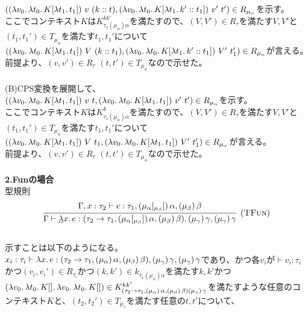 \documentclass[japanese,draft]{jssst_ppl} %
\begin{document}
$(\LamP{v_0}{\Lam{t_0}{K[\Lam{t_1}{t_1}]}}\ v\ \ConsP{k}{t}, \LamP{v_0}{\Lam{t_0}{K[\Lam{t_1}{\Cons{k'}{t_1}}]}}\ v'\ t')\in R_{\mu_{\alpha}}$を示す。\\
ここでコンテキスト$K$は$K^{kk'}_{\tau_1(\mu_{\alpha})\alpha}$を満たすので、$(V,V')\in R_{\tau}$を満たす$V,V'$と$(t_1, t_1')\in T_{\mu_{\alpha}}$を満たす$t_1, t_1'$について\\
$(\LamP{v_0}{\Lam{t_0}{K[\Lam{t_1}{t_1}]}}\ V\ \ConsP{k}{t_1}, \LamP{v_0}{\Lam{t_0}{K[\Lam{t_1}{\Cons{k'}{t_1}}]}}\ V'\ t_1')\in R_{\mu_{\alpha}}$が言える。\\
前提より、$(v,v')\in R_{\tau}$ $(t, t') \in T_{\mu_{\alpha}}$なので示せた。\\
\\
(B)CPS変換を展開して、\\
$(\LamP{v_0}{\Lam{t_0}{K[\Lam{t_1}{t_1}]}}\ v\ t, \LamP{v_0}{\Lam{t_0}{K[\Lam{t_1}{t_1}]}}\ v'\ t')\in R_{\mu_{\alpha}}$を示す。\\
ここでコンテキスト$K$は$K^k_{\tau_1(\mu_{\alpha})\alpha}$を満たすので、$(V,V')\in R_{\tau}$を満たす$V,V'$と$(t_1, t_1')\in T_{\mu_{\alpha}}$を満たす$t_1, t_1'$について\\
$(\LamP{v_0}{\Lam{t_0}{K[\Lam{t_1}{t_1}]}}\ V\ t_1, \LamP{v_0}{\Lam{t_0}{K[\Lam{t_1}{t_1}]}}\ V'\ t_1')\in R_{\mu_{\alpha}}$が言える。\\
前提より、$(v,v')\in R_{\tau}$ $(t, t') \in T_{\mu_{\alpha}}$なので示せた。\\
\\
\textbf{2.Funの場合}\\
型規則
\[
\begin{array}{c}
\infer[\TFun]
      {\JudgeTrail{\Gamma}{\DLam{x}{e}}
                  {\ArrowTrailP{\tau_2}{\tau_1}
                               {\TrailsType{\alpha}{\beta}}
                               {\TrailType{\beta}}}
                  {\TrailType{\gamma}}
                  {\TrailType{\gamma}}}
      {\JudgeTrail{\Gamma,x:\tau_2}{e}{\tau_1}
                  {\TrailsType{\alpha}{\beta}}
                  {\TrailType{\beta}}}
\end{array}
\]
\\
示すことは以下のようになる。\\
$x_i:\tau_i \vdash \lambda{x}.\,{e}:(\tau_2\rightarrow{\tau_1},(\mu_{\alpha})\,\alpha,(\mu_{\beta})\,\beta), (\mu_{\gamma})\,\gamma, (\mu_{\gamma})\,\gamma$であり、かつ各$v_i$が$\vdash v_i:\tau_i$かつ$(v_i,v_i') \in R_{\tau_i}$かつ$(k,k')\in k_{\tau_1(\mu_{\alpha})\alpha}$を満たす$k,k'$かつ$(\lambda{v_0}.\,{\lambda{t_0}.\,{K[]}}, \lambda{v_0}.\,{\lambda{t_0}.\,{K[]}})\in  K^{kk'}_{(\tau_2\rightarrow{\tau_1},(\mu_{\alpha})\,\alpha,(\mu_{\beta})\,\beta) (\mu_{\gamma})\,\gamma}$を満たすような任意のコンテキスト$K$と、$(t_2, t_2') \in T_{\mu_{\gamma}}$を満たす任意の$t, t'$について、\\
\end{document}
